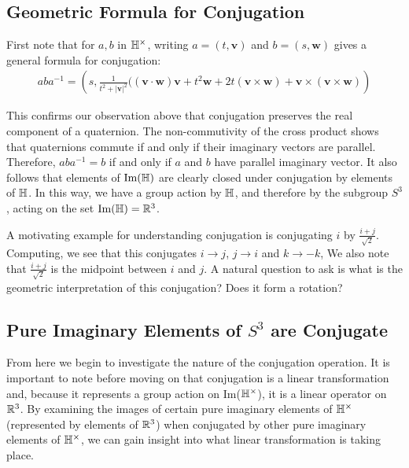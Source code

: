 \documentclass{article}
\begin{document}
\subsection{Geometric Formula for Conjugation}

First note that for $a,b$ in $\protect\mathbb{H}^\times$, writing $a=(t,\mathbf{v})$ and $b=(s,\mathbf{w})$ gives a general formula for conjugation:
\begin{align*}
    aba^{-1} = \left( s, \frac{1}{t^2+|\mathbf{v}|^2} ((\mathbf{v}\cdot\mathbf{w})\mathbf{v} +  t^2\mathbf{w} + 2t(\mathbf{v}\times\mathbf{w})+\mathbf{v}\times(\mathbf{v}\times\mathbf{w}) \right)
\end{align*}

This confirms our observation above that conjugation preserves the real component of a quaternion. The non-commutivity of the cross product shows that quaternions commute if and only if their imaginary vectors are parallel. Therefore, $aba^{-1} = b$ if and only if $a$ and $b$ have parallel imaginary vector.
It also follows that elements of $\text{Im}(\protect\mathbb{H})$ are clearly closed under conjugation by elements of $\protect\mathbb{H}$. In this way, we have a group action by $\protect\mathbb{H}$, and therefore by the subgroup $S^3$, acting on the set $\text{Im}(\protect\mathbb{H})=\protect\mathbb{R}^3$.


A motivating example for understanding conjugation is conjugating $i$ by $\frac{i + j}{\sqrt{2}}$. Computing, we see that this conjugates $i \rightarrow j$, $j\rightarrow i$ and $k\rightarrow -k$, We also note that $\frac{i+j}{\sqrt{2}}$ is the midpoint between $i$ and $j$. A natural question to ask is what is the geometric interpretation of this conjugation? Does it form a rotation? 

\subsection{Pure Imaginary Elements of $S^3$ are Conjugate}    

From here we begin to investigate the nature of the conjugation operation. It is important to note before moving on that conjugation is a linear transformation and, because it represents a group action on Im($\protect\mathbb{H}^\times$), it is a linear operator on $\protect\mathbb{R}^3$. By examining the images of certain pure imaginary elements of $\protect\mathbb{H}^\times$ (represented by elements of $\protect\mathbb{R}^3$) when conjugated by other pure imaginary elements of $\protect\mathbb{H}^\times$, we can gain insight into what linear transformation is taking place. 
\end{document}
